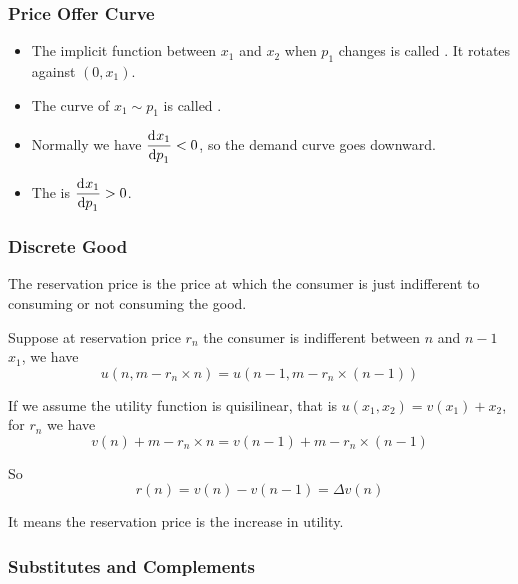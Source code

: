 \subsubsection{Price Offer Curve}   

\begin{itemize}
    \item The implicit function between $x_1$ and $x_2$ when $p_1$ changes is called . It rotates against $(0,x_1)$.
    \item The curve of $x_1 \sim p_1$ is called .
    \item Normally we have $\dod{x_1}{p_1} < 0$, so the demand curve goes downward.
    \item The  is $\dod{x_1}{p_1} > 0$.
\end{itemize}

\subsubsection{Discrete Good}

\begin{definition}
    The reservation price is the price at which the consumer is just indifferent to consuming or not consuming the good.
\end{definition}

Suppose at reservation price $r_n$ the consumer is indifferent between $n$ and $n-1$ $x_1$, we have
\begin{equation}
    u(n, m - r_n \times n) = u(n-1, m - r_n \times (n-1))
\end{equation}

If we assume the utility function is quisilinear, that is $u(x_1,x_2) = v(x_1) + x_2$, for $r_n$ we have
\begin{equation}
    v(n) + m - r_n \times n = v(n-1) + m - r_n \times (n-1)
\end{equation}

So
\begin{equation}
    r(n) = v(n) - v(n-1) = \Delta v(n)
\end{equation}

It means the reservation price is the increase in utility.

\subsubsection{Substitutes and Complements}

